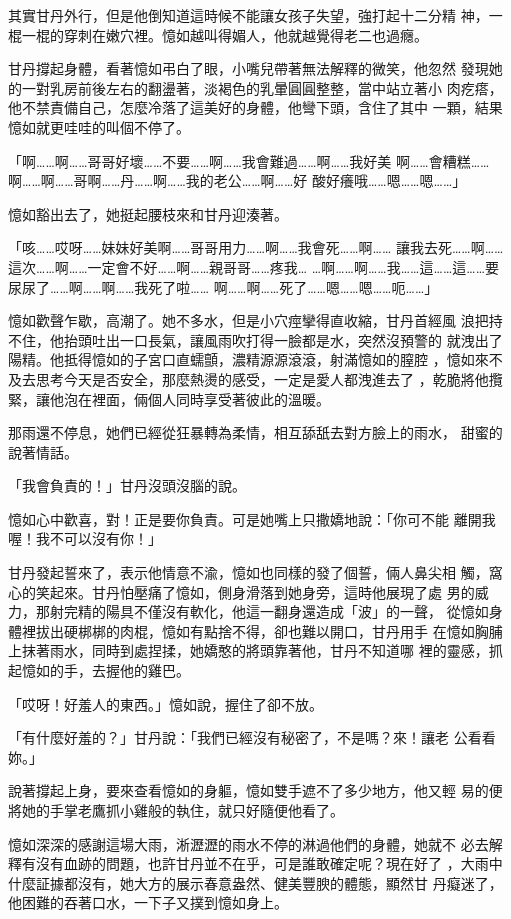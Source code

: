 其實甘丹外行，但是他倒知道這時候不能讓女孩子失望，強打起十二分精
神，一棍一棍的穿刺在嫩穴裡。憶如越叫得媚人，他就越覺得老二也過癮。

甘丹撐起身體，看著憶如弔白了眼，小嘴兒帶著無法解釋的微笑，他忽然
發現她的一對乳房前後左右的翻盪著，淡褐色的乳暈圓圓整整，當中站立著小
肉疙瘩，他不禁責備自己，怎麼冷落了這美好的身體，他彎下頭，含住了其中
一顆，結果憶如就更哇哇的叫個不停了。

「啊……啊……哥哥好壞……不要……啊……我會難過……啊……我好美
啊……會糟糕……啊……啊……哥啊……丹……啊……我的老公……啊……好
酸好癢哦……嗯……嗯……」

憶如豁出去了，她挺起腰枝來和甘丹迎湊著。

「咳……哎呀……妹妹好美啊……哥哥用力……啊……我會死……啊……
讓我去死……啊……這次……啊……一定會不好……啊……親哥哥……疼我…
…啊……啊……我……這……這……要尿尿了……啊……啊……我死了啦……
啊……啊……死了……嗯……嗯……呃……」

憶如歡聲乍歇，高潮了。她不多水，但是小穴痙攣得直收縮，甘丹首經風
浪把持不住，他抬頭吐出一口長氣，讓風雨吹打得一臉都是水，突然沒預警的
就洩出了陽精。他抵得憶如的子宮口直蠕顫，濃精源源滾滾，射滿憶如的膣腔
，憶如來不及去思考今天是否安全，那麼熱燙的感受，一定是愛人都洩進去了
，乾脆將他攬緊，讓他泡在裡面，倆個人同時享受著彼此的溫暖。

那雨還不停息，她們已經從狂暴轉為柔情，相互舔舐去對方臉上的雨水，
甜蜜的說著情話。

「我會負責的！」甘丹沒頭沒腦的說。

憶如心中歡喜，對！正是要你負責。可是她嘴上只撒嬌地說：「你可不能
離開我喔！我不可以沒有你！」

甘丹發起誓來了，表示他情意不渝，憶如也同樣的發了個誓，倆人鼻尖相
觸，窩心的笑起來。甘丹怕壓痛了憶如，側身滑落到她身旁，這時他展現了處
男的威力，那射完精的陽具不僅沒有軟化，他這一翻身還造成「波」的一聲，
從憶如身體裡拔出硬梆梆的肉棍，憶如有點捨不得，卻也難以開口，甘丹用手
在憶如胸脯上抹著雨水，同時到處捏揉，她嬌憨的將頭靠著他，甘丹不知道哪
裡的靈感，抓起憶如的手，去握他的雞巴。

「哎呀！好羞人的東西。」憶如說，握住了卻不放。

「有什麼好羞的？」甘丹說：「我們已經沒有秘密了，不是嗎？來！讓老
公看看妳。」

說著撐起上身，要來查看憶如的身軀，憶如雙手遮不了多少地方，他又輕
易的便將她的手掌老鷹抓小雞般的執住，就只好隨便他看了。

憶如深深的感謝這場大雨，淅瀝瀝的雨水不停的淋過他們的身體，她就不
必去解釋有沒有血跡的問題，也許甘丹並不在乎，可是誰敢確定呢？現在好了
，大雨中什麼証據都沒有，她大方的展示春意盎然、健美豐腴的體態，顯然甘
丹癡迷了，他困難的吞著口水，一下子又撲到憶如身上。

